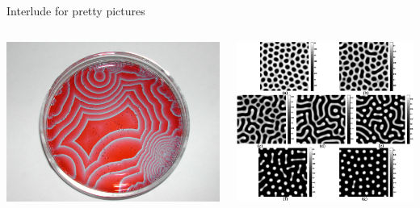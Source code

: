 \documentclass[presentation]{beamer}
\begin{document}
\begin{frame}[label={sec:orgc75435d}]{Interlude for pretty pictures}
\begin{columns}
\begin{column}{0.5\columnwidth}
\begin{center}
\includegraphics[width=.9\linewidth]{./BZ.jpg}
\end{center}
\end{column}

\begin{column}{0.5\columnwidth}
\begin{center}
\includegraphics[width=.9\linewidth]{./turingpatterns.png}
\end{center}
\end{column}
\end{columns}
\end{frame}
\end{document}

